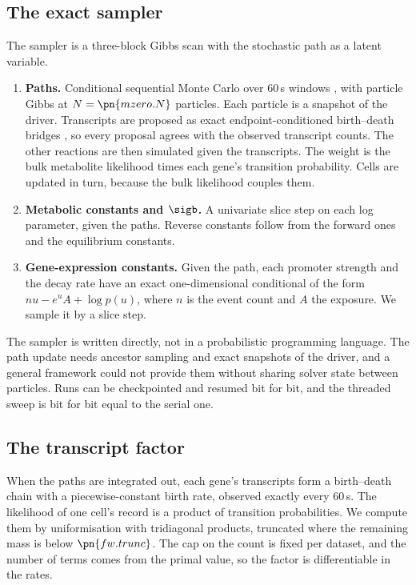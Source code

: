 \subsection{The exact sampler}
\label{sec:sampler}

The sampler is a three-block Gibbs scan with the stochastic path as a latent variable.
\begin{enumerate}
  \item \textbf{Paths.} Conditional sequential Monte Carlo over 60\,s windows
  \cite{andrieu2010particle}, with particle Gibbs at $N = \pn{mzero.N}$ particles. Each
  particle is a snapshot of the driver. Transcripts are proposed as exact
  endpoint-conditioned birth--death bridges \cite{hobolth2009simulation}, so every
  proposal agrees with the observed transcript counts. The other reactions are then
  simulated given the transcripts. The weight is the bulk metabolite likelihood
  times each gene's transition probability. Cells are updated in turn, because the
  bulk likelihood couples them.
  \item \textbf{Metabolic constants and $\sigb$.} A univariate slice step on each log
  parameter, given the paths. Reverse constants follow from the forward ones and the
  equilibrium constants.
  \item \textbf{Gene-expression constants.} Given the path, each promoter strength
  and the decay rate have an exact one-dimensional conditional of the form
  $n u - e^{u} A + \log p(u)$, where $n$ is the event count and $A$ the exposure. We
  sample it by a slice step.
\end{enumerate}
The sampler is written directly, not in a probabilistic programming language. The
path update needs ancestor sampling and exact snapshots of the driver, and a general
framework could not provide them without sharing solver state between particles.
Runs can be checkpointed and resumed bit for bit, and the threaded sweep is bit for
bit equal to the serial one.

\subsection{The transcript factor}
\label{sec:txfactor}

When the paths are integrated out, each gene's transcripts form a birth--death chain
with a piecewise-constant birth rate, observed exactly every 60\,s. The likelihood of
one cell's record is a product of transition probabilities. We compute them by
uniformisation with tridiagonal products, truncated where the remaining mass is below
$\pn{fw.trunc}$. The cap on the count is fixed per dataset, and the number of terms comes
from the primal value, so the factor is differentiable in the rates.

